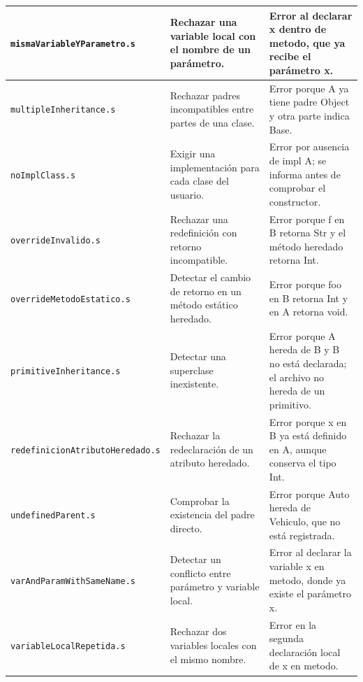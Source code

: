 \begin{longtable}{|
>{\raggedright\arraybackslash}p{}|
>{\raggedright\arraybackslash}p{}|
>{\raggedright\arraybackslash}p{}|}
\texttt{mismaVariableYParametro\allowbreak .s} & Rechazar una variable local con el nombre de un parámetro. & Error al declarar x dentro de metodo, que ya recibe el parámetro x. \\ \hline
\texttt{multipleInheritance\allowbreak .s} & Rechazar padres incompatibles entre partes de una clase. & Error porque A ya tiene padre Object y otra parte indica Base. \\ \hline
\texttt{noImplClass\allowbreak .s} & Exigir una implementación para cada clase del usuario. & Error por ausencia de impl A; se informa antes de comprobar el constructor. \\ \hline
\texttt{overrideInvalido\allowbreak .s} & Rechazar una redefinición con retorno incompatible. & Error porque f en B retorna Str y el método heredado retorna Int. \\ \hline
\texttt{overrideMetodoEstatico\allowbreak .s} & Detectar el cambio de retorno en un método estático heredado. & Error porque foo en B retorna Int y en A retorna void. \\ \hline
\texttt{primitiveInheritance\allowbreak .s} & Detectar una superclase inexistente. & Error porque A hereda de B y B no está declarada; el archivo no hereda de un primitivo. \\ \hline
\texttt{redefinicionAtributoHeredado\allowbreak .s} & Rechazar la redeclaración de un atributo heredado. & Error porque x en B ya está definido en A, aunque conserva el tipo Int. \\ \hline
\texttt{undefinedParent\allowbreak .s} & Comprobar la existencia del padre directo. & Error porque Auto hereda de Vehiculo, que no está registrada. \\ \hline
\texttt{varAndParamWithSameName\allowbreak .s} & Detectar un conflicto entre parámetro y variable local. & Error al declarar la variable x en metodo, donde ya existe el parámetro x. \\ \hline
\texttt{variableLocalRepetida\allowbreak .s} & Rechazar dos variables locales con el mismo nombre. & Error en la segunda declaración local de x en metodo. \\ \hline
\end{longtable}
\endgroup
